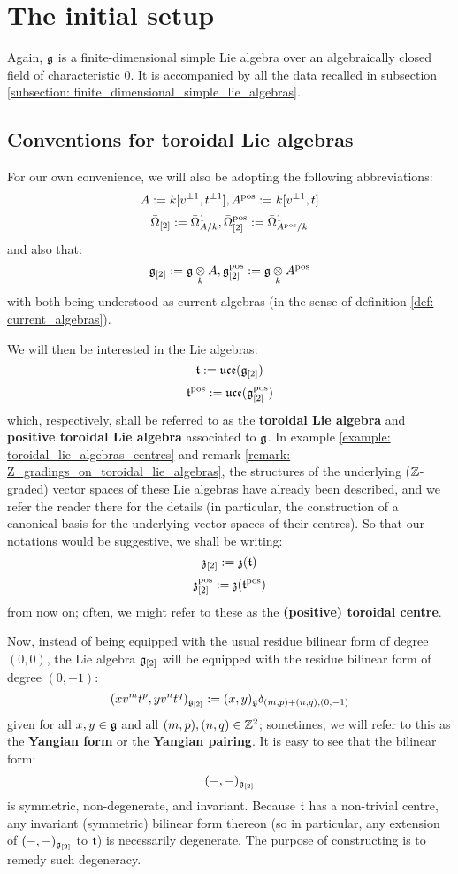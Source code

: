 \section{The initial setup}
    Again, $\mathfrak{g}$ is a finite-dimensional simple Lie algebra over an algebraically closed field of characteristic $0$. It is accompanied by all the data recalled in subsection \ref{subsection: finite_dimensional_simple_lie_algebras}. 

    \subsection{Conventions for toroidal Lie algebras}
        For our own convenience, we will also be adopting the following abbreviations:
            $$A := k[v^{\pm 1}, t^{\pm 1}], A^{\mathrm{pos}} := k[v^{\pm 1}, t]$$
            $$\bar{\Omega}_{[2]} := \bar{\Omega}^1_{A/k}, \bar{\Omega}_{[2]}^{\mathrm{pos}} := \bar{\Omega}^1_{A^{\mathrm{pos}}/k}$$
        and also that:
            $$\g_{[2]} := \g \tensor_k A, \g_{[2]}^{\positive} := \g \tensor_k A^{\positive}$$
        with both being understood as current algebras (in the sense of definition \ref{def: current_algebras}).
    
        We will then be interested in the Lie algebras:
            $$\mathfrak{t} := \mathfrak{uce}(\mathfrak{g}_{[2]})$$
            $$\mathfrak{t}^{\mathrm{pos}} := \mathfrak{uce}(\mathfrak{g}_{[2]}^{\mathrm{pos}})$$
        which, respectively, shall be referred to as the \textbf{toroidal Lie algebra} and \textbf{positive toroidal Lie algebra} associated to $\mathfrak{g}$. In example \ref{example: toroidal_lie_algebras_centres} and remark \ref{remark: Z_gradings_on_toroidal_lie_algebras}, the structures of the underlying ($\mathbb{Z}$-graded) vector spaces of these Lie algebras have already been described, and we refer the reader there for the details (in particular, the construction of a canonical basis for the underlying vector spaces of their centres). So that our notations would be suggestive, we shall be writing:
            $$\mathfrak{z}_{[2]} := \mathfrak{z}(\mathfrak{t})$$
            $$\mathfrak{z}_{[2]}^{\mathrm{pos}} := \mathfrak{z}(\mathfrak{t}^{\mathrm{pos}})$$
        from now on; often, we might refer to these as the \textbf{(positive) toroidal centre}.
        
        Now, instead of being equipped with the usual residue bilinear form of degree $(0, 0)$, the Lie algebra $\mathfrak{g}_{[2]}$ will be equipped with the residue bilinear form of degree $(0, -1)$:
            $$(x v^m t^p, y v^n t^q)_{\mathfrak{g}_{[2]}} := (x, y)_{\mathfrak{g}} \delta_{(m, p) + (n, q), (0, -1)}$$
        given for all $x, y \in \mathfrak{g}$ and all $(m, p), (n, q) \in \mathbb{Z}^2$; sometimes, we will refer to this as the \textbf{Yangian form} or the \textbf{Yangian pairing}. It is easy to see that the bilinear form:
            $$(-, -)_{\mathfrak{g}_{[2]}}$$
        is symmetric, non-degenerate, and invariant. Because $\mathfrak{t}$ has a non-trivial centre, any invariant (symmetric) bilinear form thereon (so in particular, any extension of $(-, -)_{\mathfrak{g}_{[2]}}$ to $\mathfrak{t}$) is necessarily degenerate. The purpose of constructing  is to remedy such degeneracy.

